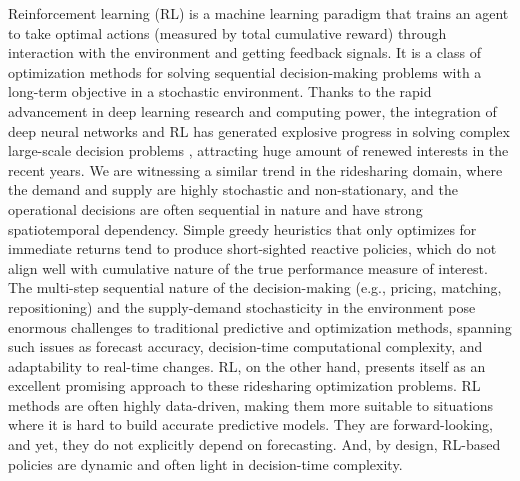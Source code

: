 \documentclass{article}
\begin{document}
Reinforcement learning (RL) is a machine learning paradigm that trains an agent to take optimal actions (measured by total cumulative reward) through interaction with the environment and getting feedback signals. It is a class of optimization methods for solving sequential decision-making problems with a long-term objective in a stochastic environment. Thanks to the rapid advancement in deep learning research and computing power, the integration of deep neural networks and RL has generated explosive progress in solving complex large-scale decision problems \citep{silver2016alphago,berner2019dota}, attracting huge amount of renewed interests in the recent years. We are witnessing a similar trend in the ridesharing domain, where the demand and supply are highly stochastic and non-stationary, and the operational decisions are often sequential in nature and have strong spatiotemporal dependency. Simple greedy heuristics that only optimizes for immediate returns tend to produce short-sighted reactive policies, which do not align well with cumulative nature of the true performance measure of interest. The multi-step sequential nature of the decision-making (e.g., pricing, matching, repositioning) and the supply-demand stochasticity in the environment pose enormous challenges to traditional predictive and optimization methods, spanning such issues as forecast accuracy, decision-time computational complexity, and adaptability to real-time changes.
RL, on the other hand, presents itself as an excellent promising approach to these ridesharing  optimization problems. RL methods are often highly data-driven, making them more suitable to situations where it is hard to build accurate predictive models. They are forward-looking, and yet, they do not explicitly depend on forecasting. And, by design, RL-based policies are dynamic and often light in decision-time complexity.
\end{document}

